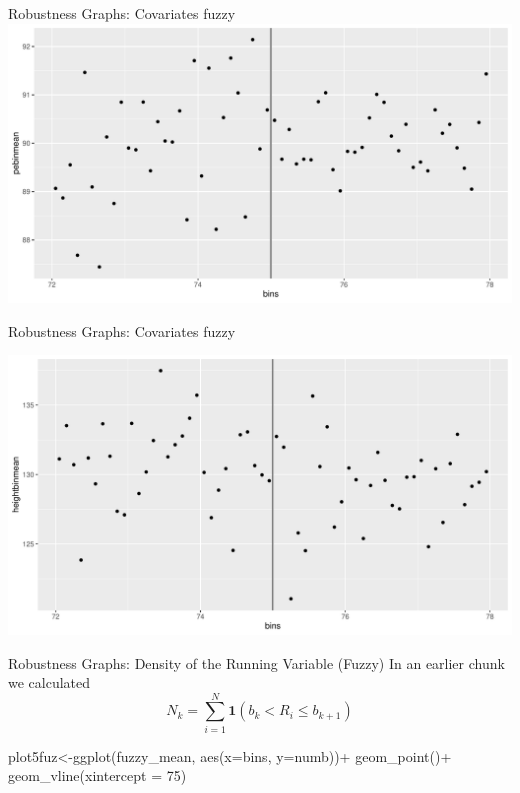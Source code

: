 \documentclass[
  ignorenonframetext,
]{beamer}
\newenvironment{Shaded}{\begin{snugshade}}{\end{snugshade}}
\newcommand{\AttributeTok}[1]{\textcolor[rgb]{0.77,0.63,0.00}{#1}}
\newcommand{\DecValTok}[1]{\textcolor[rgb]{0.00,0.00,0.81}{#1}}
\newcommand{\FunctionTok}[1]{\textcolor[rgb]{0.00,0.00,0.00}{#1}}
\newcommand{\NormalTok}[1]{#1}
\newcommand{\OtherTok}[1]{\textcolor[rgb]{0.56,0.35,0.01}{#1}}
\newcommand{\SpecialCharTok}[1]{\textcolor[rgb]{0.00,0.00,0.00}{#1}}
\begin{document}
\begin{frame}{Robustness Graphs: Covariates fuzzy}
\protect\hypertarget{robustness-graphs-covariates-fuzzy-1}{}
\includegraphics{Slides9_RD_files/figure-beamer/fuz4aa-1.pdf}
\end{frame}

\begin{frame}{Robustness Graphs: Covariates fuzzy}
\protect\hypertarget{robustness-graphs-covariates-fuzzy-2}{}
\tiny

\includegraphics{Slides9_RD_files/figure-beamer/fuz4b-1.pdf}
\end{frame}

\begin{frame}[fragile]{Robustness Graphs: Density of the Running
Variable (Fuzzy)}
\protect\hypertarget{robustness-graphs-density-of-the-running-variable-fuzzy}{}
In an earlier chunk we calculated \[
N_k=\sum_{i=1}^N\mathbf{1}(b_k<R_i\leq b_{k+1})
\]

\tiny

\begin{Shaded}
\begin{Highlighting}[]
\NormalTok{plot5fuz}\OtherTok{\textless{}{-}}\FunctionTok{ggplot}\NormalTok{(fuzzy\_mean, }\FunctionTok{aes}\NormalTok{(}\AttributeTok{x=}\NormalTok{bins, }\AttributeTok{y=}\NormalTok{numb))}\SpecialCharTok{+} 
         \FunctionTok{geom\_point}\NormalTok{()}\SpecialCharTok{+}
         \FunctionTok{geom\_vline}\NormalTok{(}\AttributeTok{xintercept =} \DecValTok{75}\NormalTok{)}
\end{Highlighting}
\end{Shaded}
\end{frame}
\end{document}
